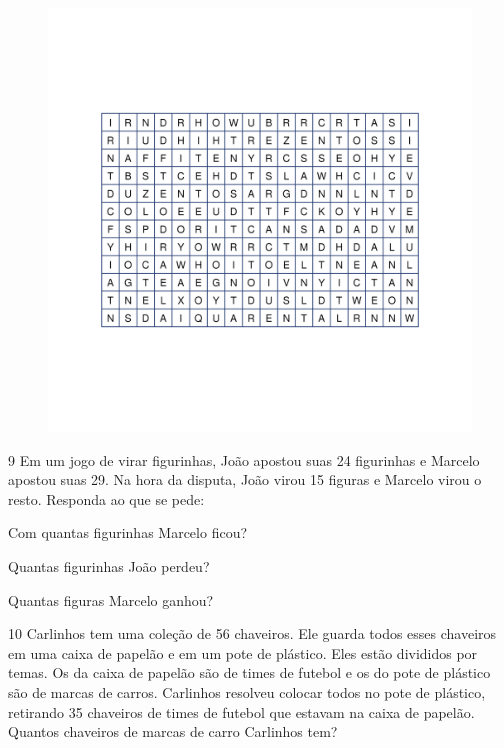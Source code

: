 \begin{figure}[H]
\centering
\includegraphics[width=.8\textwidth]{./media/image27.png}
\end{figure}


\pagebreak
\num{9} Em um jogo de virar figurinhas, João apostou suas 24 figurinhas e Marcelo apostou suas 29. Na hora da disputa, João virou 15 figuras e Marcelo virou o resto. Responda ao que se pede:

\begin{escolha}
\item Com quantas figurinhas Marcelo ficou?


\item Quantas figurinhas João perdeu?


\item Quantas figuras Marcelo ganhou?

\end{escolha}

\num{10} Carlinhos tem uma coleção de 56 chaveiros. Ele guarda todos esses
chaveiros em uma caixa de papelão e em um pote de plástico. Eles estão
divididos por temas. Os da caixa de papelão são de times de futebol e os
do pote de plástico são de marcas de carros. Carlinhos resolveu colocar
todos no pote de plástico, retirando 35 chaveiros de times de futebol que estavam na
caixa de papelão. Quantos chaveiros de marcas de
carro Carlinhos tem?

